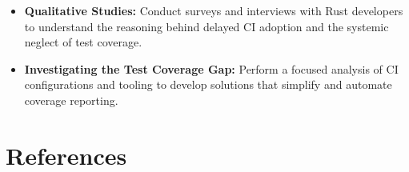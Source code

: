\documentclass[11pt]{article}
\begin{document}
\begin{itemize}
    \item \textbf{Qualitative Studies:} Conduct surveys and interviews with Rust developers to understand the reasoning behind delayed CI adoption and the systemic neglect of test coverage.

    \item \textbf{Investigating the Test Coverage Gap:} Perform a focused analysis of CI configurations and tooling to develop solutions that simplify and automate coverage reporting.

\end{itemize}

\section{References}
\printbibliography[heading=none]
\end{document}

